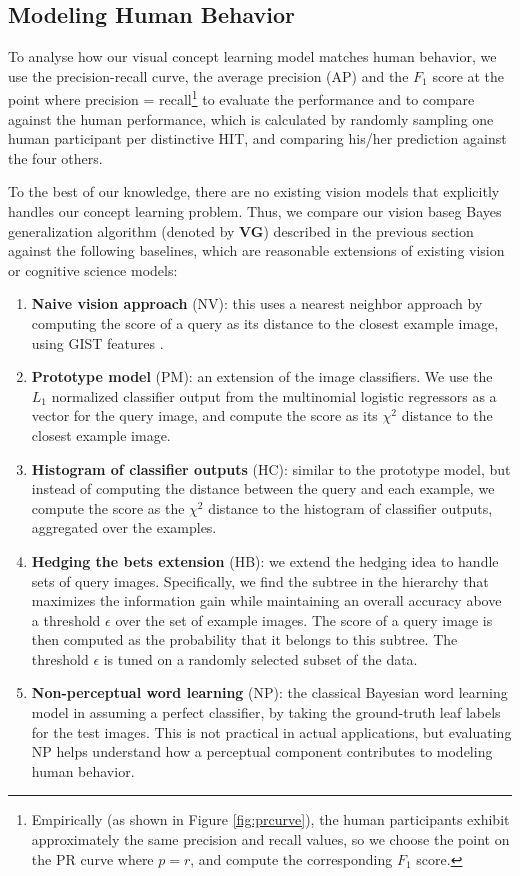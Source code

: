 \subsection{Modeling Human Behavior}
To analyse how our visual concept learning model matches human behavior, we use the precision-recall curve, the average precision (AP) and the $F_1$ score at the point where precision = recall\footnote{Empirically (as shown in Figure \ref{fig:prcurve}), the human participants exhibit approximately the same precision and recall values, so we choose the point on the PR curve where $p = r$, and compute the corresponding $F_1$ score.}
to evaluate the performance and to compare against the human performance, which is calculated by randomly sampling one human participant per distinctive HIT, and comparing his/her prediction against the four others.

To the best of our knowledge, there are no existing vision models that explicitly handles our concept learning problem. Thus, we compare our vision baseg Bayes generalization algorithm (denoted by {\bfseries VG}) described in the previous section against the following baselines, which are reasonable extensions of existing vision or cognitive science models:
\begin{enumerate}\setlength{\itemsep}{0pt}\setlength{\parskip}{0pt}
    \item {\bfseries Naive vision approach} (NV): this uses a nearest neighbor approach by computing the score of a query as its distance to the closest example image, using GIST features \cite{oliva2001modeling}.
    \item {\bfseries Prototype model} (PM): an extension of the image classifiers. We use the $L_1$ normalized classifier output from the multinomial logistic regressors as a vector for the query image, and compute the score as its $\chi^2$ distance to the closest example image.
    \item {\bfseries Histogram of classifier outputs} (HC): similar to the prototype model, but instead of computing the distance between the query and each example, we compute the score as the $\chi^2$ distance to the histogram of classifier outputs, aggregated over the examples.
    \item {\bfseries Hedging the bets extension} (HB): we extend the hedging idea \cite{deng2012hedging} to handle sets of query images. Specifically, we find the subtree in the hierarchy that maximizes the information gain while maintaining an overall accuracy above a threshold $\epsilon$ over the set of example images. The score of a query image is then computed as the probability that it belongs to this subtree. The threshold $\epsilon$ is tuned on a randomly selected subset of the data.
    \item {\bfseries Non-perceptual word learning} (NP): the classical Bayesian word learning model in \cite{xu2007word} assuming a perfect classifier, \ie by taking the ground-truth leaf labels for the test images. This is not practical in actual applications, but evaluating NP helps understand how a perceptual component contributes to modeling human behavior.
\end{enumerate}

